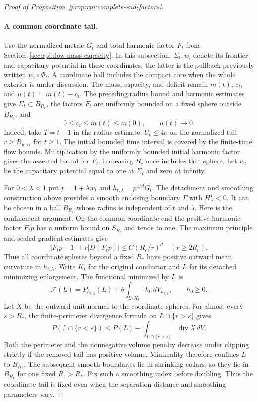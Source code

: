 \begin{proof}[Proof of Proposition~\ref{prop:rpi:complete-end-factors}]
\paragraph{A common coordinate tail.}
Use the normalized metric $G_t$ and total harmonic factor $F_t$
from Section~\ref{sec:rpi:flow-mass-capacity}. In this subsection,
$\Sigma_t,w_t$ denote its frontier and capacitary potential in these
coordinates; the latter is the pullback previously written
$w_t\circ\Phi_t$. A coordinate ball includes the compact core when
the whole exterior is under discussion. The mass, capacity, and deficit
remain $m(t)$, $c_t$, and $\mu(t)=m(t)-c_t$.
The preceding radius bound and harmonic estimates give
$\Sigma_t\subset B_{R_c}$, the factors $F_t$ are uniformly bounded on
a fixed sphere outside $B_{R_c}$, and
\[
 0\le c_t\le m(t)\le m(0),\qquad \mu(t)\longrightarrow0.
\]
Indeed, take $T=t-1$ in the radius estimate: $U_t\le4e$ on the
normalized tail $r\ge R_{\max}$ for $t\ge1$. The initial bounded time
interval is covered by the finite-time flow bounds. Multiplication by
the uniformly bounded initial harmonic factor gives the asserted
bound for $F_t$. Increasing $R_c$ once includes that sphere. Let $w_t$ be the
capacitary potential equal to one at $\Sigma_t$ and zero at infinity.

For $0<\lambda<1$ put $p=1+\lambda w_t$ and
$h_{t,\lambda}=p^{4/d}G_t$.  The detachment and smoothing construction
above provides a smooth enclosing boundary $\Gamma$ with
$H_\nu^\Gamma<0$.  It can be chosen in a ball $B_{R_1}$ whose radius
is independent of $t$ and $\lambda$.  Here is the confinement
argument.  On the common coordinate end the positive harmonic factor
$F_tp$ has a uniform bound on $S_{R_c}$ and tends to one.  The maximum
principle and scaled gradient estimates give
\[
 |F_tp-1|+r|D(F_tp)|\le C(R_c/r)^d\quad(r\ge2R_c).
\]
Thus all coordinate spheres beyond a fixed $R_*$ have positive
outward mean curvature in $h_{t,\lambda}$. Write $K_t$ for the
original conductor and $L$ for its detached minimizing enlargement.
The functional minimized by $L$ is
\[
 \mathcal F(L)=P_{h_{t,\lambda}}(L)+
       \theta\int_{L\setminus K_t}h_0\,dV_{h_{t,\lambda}},
 \qquad h_0\ge0 .
\]
Let $X$ be the outward unit normal to the coordinate spheres.
For almost every $s>R_*$, the finite-perimeter divergence formula
on $L\cap\{r>s\}$ gives
\[
 P(L\cap\{r<s\})
 \le P(L)-\int_{L\cap\{r>s\}}\operatorname{div}X\,dV.
\]
Both the perimeter and the nonnegative volume penalty decrease under
clipping, strictly if the removed tail has positive volume.  Minimality
therefore confines $L$ to $B_{R_*}$.  The subsequent smooth boundaries
lie in shrinking collars, so they lie in $B_{R_1}$ for one
fixed $R_1>R_*$.  Fix such a smoothing index before doubling.
Thus the coordinate tail is fixed even when the separation distance
and smoothing parameters vary.


\end{proof}

